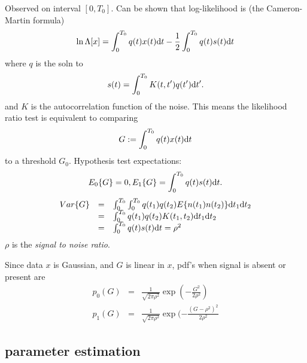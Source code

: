 Observed on interval $[0,T_0]$. Can be shown that log-likelihood is (the Cameron-Martin formula)
\begin{equation}
\label{eq:Cameron-Martin}
\ln \Lambda [x] =  \int_0^{T_0}q(t)x(t){\mbox{d}} t - \frac{1}{2}\int_0^{T_0}q(t)s(t){\mbox{d}} t
\end{equation}
where $q$ is the soln to
\begin{equation}
s(t) = \int_0^{T_0} K(t,t')q(t'){\mbox{d}} t'.
\end{equation}
and $K$ is the autocorrelation function of the noise. This means the likelihood ratio test is equivalent to comparing 
\begin{equation}
G:=\int_0^{T_0}q(t)x(t){\mbox{d}} t
\end{equation}
to a threshold $G_0$. Hypothesis test expectations:
\begin{equation}
E_0\{G\}=0,\\
E_1\{G\} = \int_0^{T_0}q(t)s(t){\mbox{d}} t.
\end{equation}
\begin{equation}
\begin{array}{rcl}
Var\{G\}&=& \int_0^{T_0}\int_0^{T_0}q(t_1)q(t_2)E\{n(t_1)n(t_2)\}{\mbox{d}} t_1  {\mbox{d}} t_2 \\
&=&\int_0^{T_0}q(t_1)q(t_2)K(t_1,t_2){\mbox{d}} t_1  {\mbox{d}} t_2\\
&=& \int_0^{T_0}q(t)s(t){\mbox{d}} t = \rho^2
\end{array}
\end{equation}
$\rho$ is the \textit{signal to noise ratio}.

Since data $x$ is Gaussian, and $G$ is linear in $x$, pdf's when signal is absent or present are
\begin{equation}
\begin{array}{rcl}
p_0(G)&=&\frac{1}{\sqrt{2\pi\rho^2}}\exp(-\frac{G^2}{2\rho^2}) \\
p_1(G)&=&\frac{1}{\sqrt{2\pi\rho^2}}\exp(-\frac{(G-\rho^2)^2}{2\rho^2}
\end{array}
\end{equation}


\subsection{parameter estimation}



